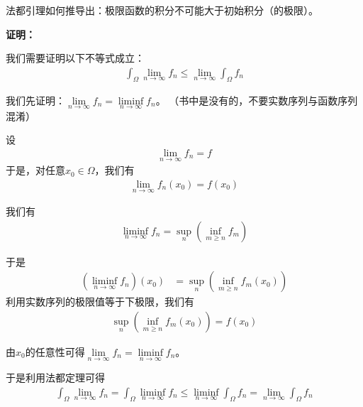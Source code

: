\documentclass{article}
\begin{document}
\begin{zremark}
  法都引理如何推导出：极限函数的积分不可能大于初始积分（的极限）。
\end{zremark}

\textbf{证明：}

我们需要证明以下不等式成立：
\begin{align*}
  \int_{\Omega} \lim\limits_{n \to \infty} f_n \leq \lim\limits_{n \to \infty} \int_{\Omega} f_n
\end{align*}

我们先证明：$\lim\limits_{n \to \infty} f_n = \liminf\limits_{n \to \infty} f_n$。
（书中是没有的，不要实数序列与函数序列混淆）

设
\begin{align*}
  \lim\limits_{n \to \infty} f_n = f
\end{align*}
于是，对任意$x_0 \in \Omega$，我们有
\begin{align*}
  \lim\limits_{n \to \infty} f_n(x_0) = f(x_0)
\end{align*}

我们有
\begin{align*}
  \liminf\limits_{n \to \infty} f_n = \sup\limits_{n} \left(\inf\limits_{m \geq n} f_m\right)
\end{align*}

于是
\begin{align*}
  (\liminf\limits_{n \to \infty} f_n)(x_0)
   & = \sup\limits_{n} \left(\inf\limits_{m \geq n} f_m (x_0) \right)
\end{align*}
利用实数序列的极限值等于下极限，我们有
\begin{align*}
  \sup\limits_{n} \left(\inf\limits_{m \geq n} f_m (x_0) \right) = f(x_0)
\end{align*}

由$x_0$的任意性可得$\lim\limits_{n \to \infty} f_n = \liminf\limits_{n \to \infty} f_n$。

于是利用法都定理可得
\begin{align*}
  \int_{\Omega} \lim\limits_{n \to \infty} f_n
  = \int_{\Omega} \liminf\limits_{n \to \infty} f_n
  \leq \liminf\limits_{n \to \infty} \int_{\Omega} f_n = \lim\limits_{n \to \infty} \int_{\Omega} f_n
\end{align*}
\end{document}
